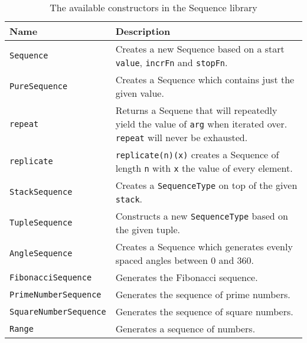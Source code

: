 \begin{table}[H]
  \centering
  \begin{tabularx}{\textwidth}{| l | X |} \hline
    \textbf{Name} & \textbf{Description} \\ \hline
    \texttt{Sequence} & Creates a new Sequence based on a start \texttt{value}, \texttt{incrFn} and \texttt{stopFn}. \\ \hline
    \texttt{PureSequence} & Creates a Sequence which contains just the given value. \\ \hline
    \texttt{repeat} & Returns a Sequene that will repeatedly yield the value of \texttt{arg} when iterated over. \texttt{repeat} will never be exhausted. \\ \hline
    \texttt{replicate} & \texttt{replicate(n)(x)} creates a Sequence of length \texttt{n} with \texttt{x} the value of every element. \\ \hline
    \texttt{StackSequence} & Creates a \texttt{SequenceType} on top of the given \texttt{stack}. \\ \hline
    \texttt{TupleSequence} & Constructs a new \texttt{SequenceType} based on the given tuple. \\ \hline
    \texttt{AngleSequence} & Creates a Sequence which generates evenly spaced angles between 0 and 360. \\ \hline
    \texttt{FibonacciSequence} & Generates the Fibonacci sequence. \\  \hline
    \texttt{PrimeNumberSequence} & Generates the sequence of prime numbers. \\ \hline
    \texttt{SquareNumberSequence} & Generates the sequence of square numbers. \\ \hline
    \texttt{Range} & Generates a sequence of numbers. \cite{wild_ip5_2023} \\ \hline
  \end{tabularx}
  \caption{The available constructors in the Sequence library}
  \label{tab:api_ctors}
\end{table}


